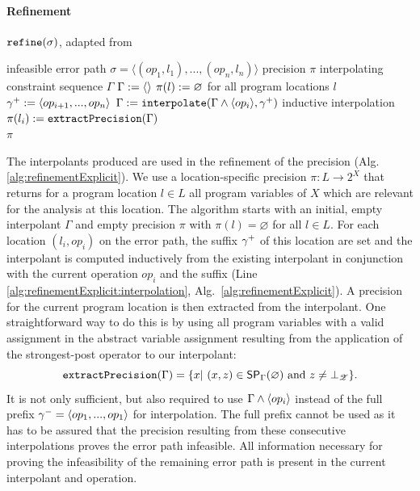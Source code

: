 \paragraph*{Refinement}
\begin{algorithm}[t]
\caption{$\texttt{refine}(\sigma)$, adapted from \cite{Beyer2015}}
\label{alg:refinementExplicit}
\begin{algorithmic}[1]
\Input infeasible error path $\sigma = \langle (op_1, l_1), ..., (op_n, l_n) \rangle$
\Output precision $\pi$
\Variables interpolating constraint sequence $\Gamma$
\State $\Gamma := \langle \rangle$
\State $\pi(l) := \varnothing$ for all program locations $l$
\label{alg:refinementExplicit:loopStart}
	\State ${\gamma^{+}} := \langle op_{i+1}, ..., op_n \rangle$
	\State $\Gamma := \texttt{interpolate}(\Gamma \wedge \langle op_i \rangle, {\gamma^{+}})$ \Comment inductive interpolation \label{alg:refinementExplicit:interpolation}
	\State $\pi(l_i) := \texttt{extractPrecision}(\Gamma)$
\EndFor\\
\Return $\pi$
\end{algorithmic}
\end{algorithm}

The interpolants produced are used in the refinement of the precision (Alg. \ref{alg:refinementExplicit}).
We use a location-specific precision $\pi : L \rightarrow 2^X$ that returns for a program location $l \in L$ all program variables of $X$ which are relevant for the analysis at this location. 
The algorithm starts with an initial, empty interpolant $\Gamma$ and empty precision $\pi$ with $\pi(l) = \varnothing$ for all $l \in L$.
For each location $(l_i, op_i)$ on the error path, the suffix ${\gamma^{+}}$ of this location are set and the interpolant is computed inductively
from the existing interpolant in conjunction with the current operation $op_i$ and the suffix (Line \ref{alg:refinementExplicit:interpolation}, Alg.~\ref{alg:refinementExplicit}).
A precision for the current program location is then extracted from the interpolant.
One straightforward way to do this is by using all program variables with a valid assignment in the  abstract variable assignment resulting from the application of the strongest-post operator to our interpolant:
\[\texttt{extractPrecision}(\Gamma) = \{ x |\ (x, z) \in \operatorname{\operatorname{\operatorname{\mathsf{SP}}}}_\Gamma (\varnothing ) \text{ and } z \neq \bot_{\mathscr{Z}} \}.\]
It is not only sufficient, but also required to use $\Gamma \wedge \langle op_i \rangle$ instead of the full prefix ${\gamma^{-}} = \langle op_1, ..., op_1 \rangle$ for interpolation. The full prefix cannot be used as it has to be assured that the precision resulting from these consecutive interpolations proves the error path infeasible. All information necessary for proving the infeasibility of the remaining error path is present in the current interpolant and operation.

